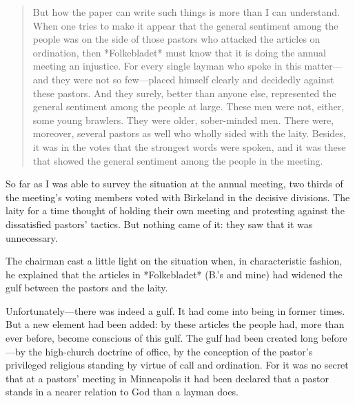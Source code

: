 \begin{quote}
But how the paper can write such things is more than I can understand. When one tries to make it appear that the general sentiment among the people was on the side of those pastors who attacked the articles on ordination, then *Folkebladet* must know that it is doing the annual meeting an injustice. For every single layman who spoke in this matter—and they were not so few—placed himself clearly and decidedly against these pastors. And they surely, better than anyone else, represented the general sentiment among the people at large. These men were not, either, some young brawlers. They were older, sober-minded men. There were, moreover, several pastors as well who wholly sided with the laity. Besides, it was in the votes that the strongest words were spoken, and it was these that showed the general sentiment among the people in the meeting.
\end{quote}

So far as I was able to survey the situation at the annual meeting, two thirds of the meeting’s voting members voted with Birkeland in the decisive divisions. The laity for a time thought of holding their own meeting and protesting against the dissatisfied pastors’ tactics. But nothing came of it: they saw that it was unnecessary.

The chairman cast a little light on the situation when, in characteristic fashion, he explained that the articles in *Folkebladet* (B.’s and mine) had widened the gulf between the pastors and the laity.

Unfortunately—there was indeed a gulf. It had come into being in former times. But a new element had been added: by these articles the people had, more than ever before, become conscious of this gulf. The gulf had been created long before—by the high-church doctrine of office, by the conception of the pastor’s privileged religious standing by virtue of call and ordination. For it was no secret that at a pastors’ meeting in Minneapolis it had been declared that a pastor stands in a nearer relation to God than a layman does.

